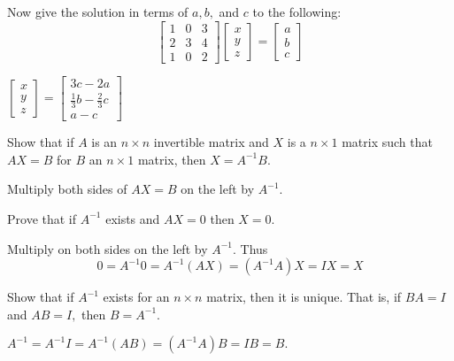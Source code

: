 \documentclass{ximera}
\begin{document}
\begin{problem}
\item Now give the solution in terms of $a,b,$ and $c$ to the following:
\begin{equation*}
\left[
\begin{array}{rrr}
1 & 0 & 3 \\
2 & 3 & 4 \\
1 & 0 & 2
\end{array}
\right] \left[
\begin{array}{c}
x \\
y \\
z
\end{array}
\right] =\left[
\begin{array}{c}
a \\
b \\
c
\end{array}
\right]
\end{equation*}
\begin{hint}
$\left[
\begin{array}{c}
x \\
y \\
z
\end{array}
\right] =
\left[
\begin{array}{c}
3c-2a \\
\frac{1}{3}b-\frac{2}{3}c \\
a-c
\end{array}
\right]$
\end{hint}
\end{problem}

\begin{problem}\label{prb:4.46}Show that if $A$ is an $n\times n$ invertible matrix and $X$
is a $n\times 1$ matrix such that $AX=B$ for $B$ an
$n\times 1$ matrix, then $X=A^{-1}B$.
\begin{hint}
Multiply both sides of $AX=B$ on the left by $A^{-1}$.
\end{hint}
\end{problem}

\begin{problem}\label{prb:4.47}Prove that if $A^{-1}$ exists and $AX=0$ then $X=0$.
\begin{hint}
Multiply on both sides on the left by $A^{-1}.$ Thus
\[
0=A^{-1}0=A^{-1}\left( AX\right) =\left(
A^{-1}A\right) X=IX = X
\]
\end{hint}
\end{problem}

\begin{problem}\label{prb:4.48}\label{exerinverseprod}Show that if $A^{-1}$ exists for an $n\times n$
matrix, then it is unique. That is, if $BA=I$ and $AB=I,$ then $B=A^{-1}.$
\begin{hint}
 $A^{-1}=A^{-1}I=A^{-1}\left( AB\right) =\left( A^{-1}A\right) B=IB=B.$
\end{hint}
\end{problem}
\end{document}
